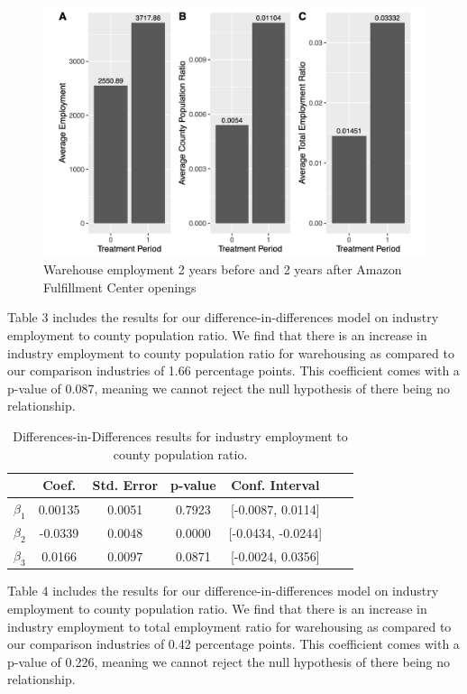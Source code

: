 \documentclass[11pt]{article}
\begin{document}
\begin{figure}[H]
\centering
\includegraphics[width=15cm]{WH.png}
\caption{Warehouse employment 2 years before and 2 years after Amazon Fulfillment Center openings}
\end{figure}


\-\hspace{0.5cm} Table 3 includes the results for our difference-in-differences model on industry employment to county population ratio. We find that there is an increase in industry employment to county population ratio for warehousing as compared to our comparison industries of 1.66 percentage points. This coefficient comes with a p-value of 0.087, meaning we cannot reject the null hypothesis of there being no relationship. 

\begin{table}[H]
\centering
\begin{tabular}[H]{lcccccc}
\toprule
&Coef.&Std. Error&p-value&Conf. Interval\\
\midrule
$\beta_1$&0.00135&0.0051&0.7923&[-0.0087, 0.0114]\\
$\beta_2$&-0.0339&0.0048&0.0000&[-0.0434, -0.0244]\\
$\beta_3$&0.0166&0.0097&0.0871&[-0.0024, 0.0356]\\
\bottomrule
\end{tabular}
\caption{Differences-in-Differences results for industry employment to county population ratio.}
\end{table}%

\-\hspace{0.5cm} Table 4 includes the results for our difference-in-differences model on industry employment to county population ratio. We find that there is an increase in industry employment to total employment ratio for warehousing as compared to our comparison industries of 0.42 percentage points. This coefficient comes with a p-value of 0.226, meaning we cannot reject the null hypothesis of there being no relationship. 
\end{document}
